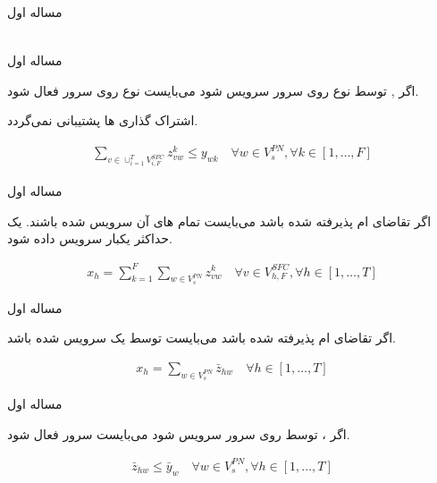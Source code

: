 \documentclass{beamer}
\begin{document}
\begin{persian}
\begin{frame}{مساله اول}
\begin{latin}
\begin{align}
	\end{align}\end{latin}
\end{frame}
\begin{frame}{مساله اول}
	\par
	اگر , 
	توسط  نوع 
	روی سرور  سرویس شود می‌بایست
	 نوع 
	روی سرور  فعال شود.
	\par
	اشتراک گذاری ها پشتیبانی نمی‌گردد.
	\begin{latin}\begin{align}
	\sum_{v \in \cup_{i=1}^T V_{i, F}^{SFC}} z_{vw}^k \le y_{wk}
	\quad
	\forall w \in V_s^{PN}, \forall k \in [1,\ldots, F]
	\end{align}\end{latin}
\end{frame}
\begin{frame}{مساله اول}
	\par
	اگر تقاضای ام پذیرفته شده باشد
	می‌بایست تمام های آن‌
	سرویس شده باشند.
	یک  حداکثر یکبار سرویس داده شود.
	\begin{latin}\begin{align}
		x_h = \sum_{k=1}^{F} \sum_{w \in V_{s}^{PN}} z_{vw}^{k}
		\quad
		\forall v \in V_{h,F}^{SFC}, \forall h \in [1,\ldots, T]
	\end{align}\end{latin}
\end{frame}
\begin{frame}{مساله اول}
	\par
	اگر تقاضای ام پذیرفته شده باشد
	می‌بایست توسط یک  سرویس شده باشد.
	\begin{latin}\begin{align}
		x_h = \sum_{w \in V_{s}^{PN}} \bar{z}_{hw}
		\quad
		\forall h \in [1,\ldots, T]
	\end{align}\end{latin}
\end{frame}
\begin{frame}{مساله اول}
	\par
	اگر ، 
	توسط  روی سرور 
	سرویس شود می‌بایست  سرور 
	فعال شود.
	\begin{latin}\begin{align}
		\bar{z}_{hw} \le \bar{y}_w
		\quad
		\forall w \in V_{s}^{PN}, \forall h \in [1,\ldots, T]
	\end{align}\end{latin}
	\par

\end{frame}
\end{persian}
\end{document}
